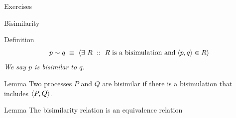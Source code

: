 \documentclass[aspectratio=169]{beamer}
\begin{document}
\begin{slide}{Exercises}


\end{slide}



\begin{slide}{Bisimilarity}
\small

\begin{block}{Definition}
\centering
\[p \sim q\; \equiv\; \rcb{\exists}{R}{}{R\; \text{is a bisimulation and}\; \pair{p,q} \in R} 
\]
\emph{We say \alert{$p$ is bisimilar to $q$}.}
\end{block}


\begin{block}{Lemma}
\centering
Two processes $P$ and $Q$ are bisimilar if there is a bisimulation that includes $\langle P,Q \rangle$.
\end{block}

\begin{block}{Lemma}
The bisimilarity relation is an equivalence relation\\
\end{block}



\end{slide}
\end{document}
